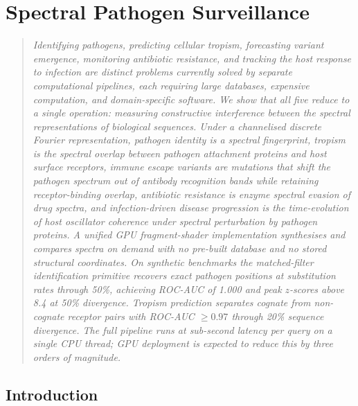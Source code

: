 
\chapter{Spectral Pathogen Surveillance}
\label{ps:ch:pathogen-surveillance}

\begin{quote}\small\itshape
Identifying pathogens, predicting cellular tropism, forecasting variant
emergence, monitoring antibiotic resistance, and tracking the host response to
infection are distinct problems currently solved by separate computational
pipelines, each requiring large databases, expensive computation, and
domain-specific software. We show that all five reduce to a single operation:
measuring constructive interference between the spectral representations of
biological sequences. Under a channelised discrete Fourier representation,
pathogen identity is a spectral fingerprint, tropism is the spectral overlap
between pathogen attachment proteins and host surface receptors, immune escape
variants are mutations that shift the pathogen spectrum out of antibody
recognition bands while retaining receptor-binding overlap, antibiotic
resistance is enzyme spectral evasion of drug spectra, and infection-driven
disease progression is the time-evolution of host oscillator coherence under
spectral perturbation by pathogen proteins. A unified GPU fragment-shader
implementation synthesises and compares spectra on demand with no pre-built
database and no stored structural coordinates. On synthetic benchmarks the
matched-filter identification primitive recovers exact pathogen positions at
substitution rates through 50\%, achieving ROC-AUC of 1.000 and peak
$z$-scores above 8.4 at 50\% divergence. Tropism prediction separates cognate
from non-cognate receptor pairs with ROC-AUC $\geq 0.97$ through 20\% sequence
divergence. The full pipeline runs at sub-second latency per query on a single
CPU thread; GPU deployment is expected to reduce this by three orders of
magnitude.
\end{quote}

\section{Introduction}
\label{ps:sec:introduction}


